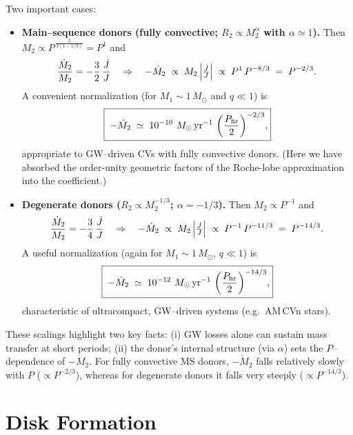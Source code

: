 \medskip
\noindent
Two important cases:

\begin{itemize}
\item \textbf{Main–sequence donors (fully convective; $R_2\propto M_2^{\alpha}$ with $\alpha\simeq 1$).}
Then $M_2\propto P^{\,\frac{2}{3(1-1/3)}}=P^{1}$ and
\[
\frac{\dot{M}_2}{M_2} = -\frac{3}{2}\,\frac{\dot{J}}{J}
\quad\Rightarrow\quad
-\dot{M}_2 \;\propto\; M_2\,\Bigl|\tfrac{\dot{J}}{J}\Bigr|
\;\propto\; P^{1}\,P^{-8/3} \;=\; P^{-2/3}.
\]
A convenient normalization (for $M_1\!\sim\!1\,M_\odot$ and $q\!\ll\!1$) is
\[
\boxed{\;
-\dot{M}_2 \;\simeq\; 10^{-10}\ M_\odot\,{\rm yr^{-1}}\,
\left(\frac{P_{\rm hr}}{2}\right)^{-2/3}\!,
}
\]
appropriate to GW–driven CVs with fully convective donors.
(Here we have absorbed the order-unity geometric factors of the Roche-lobe approximation into the coefficient.)

\item \textbf{Degenerate donors ($R_2\propto M_2^{-1/3}$; $\alpha=-1/3$).}
Then $M_2\propto P^{-1}$ and
\[
\frac{\dot{M}_2}{M_2} = -\frac{3}{4}\,\frac{\dot{J}}{J}
\quad\Rightarrow\quad
-\dot{M}_2 \;\propto\; M_2\,\Bigl|\tfrac{\dot{J}}{J}\Bigr|
\;\propto\; P^{-1}\,P^{-11/3} \;=\; P^{-14/3}.
\]
A useful normalization (again for $M_1\!\sim\!1\,M_\odot$, $q\!\ll\!1$) is
\[
\boxed{\;
-\dot{M}_2 \;\simeq\; 10^{-12}\ M_\odot\,{\rm yr^{-1}}\,
\left(\frac{P_{\rm hr}}{2}\right)^{-14/3}\!,
}
\]
characteristic of ultracompact, GW–driven systems (e.g.\ AM\,CVn stars).
\end{itemize}

\noindent
These scalings highlight two key facts:
(i) GW losses alone can sustain mass transfer at short periods; 
(ii) the donor’s internal structure (via $\alpha$) sets the $P$–dependence of $-\dot{M}_2$.
For fully convective MS donors, $-\dot{M}_2$ falls relatively slowly with $P$ ($\propto P^{-2/3}$),
whereas for degenerate donors it falls very steeply ($\propto P^{-14/3}$).


\section{Disk Formation}

